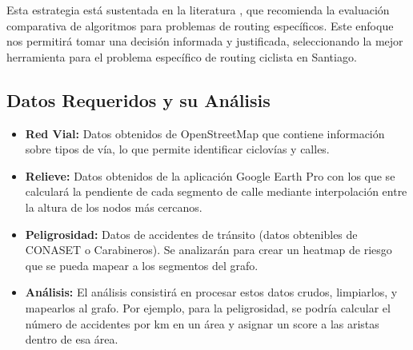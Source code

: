 \documentclass[12pt, a4paper, spanish]{article}
\begin{document}
Esta estrategia está sustentada en la literatura \cite{cormen2009}, que recomienda la evaluación comparativa de algoritmos para problemas de routing específicos. Este enfoque nos permitirá tomar una decisión informada y justificada, seleccionando la mejor herramienta para el problema específico de routing ciclista en Santiago.

\subsection{Datos Requeridos y su Análisis}

\begin{itemize}
    \item \textbf{Red Vial:} Datos obtenidos de OpenStreetMap que contiene información sobre tipos de vía, lo que permite identificar ciclovías y calles.
    \item \textbf{Relieve:} Datos obtenidos de la aplicación Google Earth Pro con los que se calculará la pendiente de cada segmento de calle mediante interpolación entre la altura de los nodos más cercanos.
    \item \textbf{Peligrosidad:} Datos de accidentes de tránsito (datos obtenibles de CONASET o Carabineros). Se analizarán para crear un heatmap de riesgo que se pueda mapear a los segmentos del grafo.
    \item \textbf{Análisis:} El análisis consistirá en procesar estos datos crudos, limpiarlos, y mapearlos al grafo. Por ejemplo, para la peligrosidad, se podría calcular el número de accidentes por km en un área y asignar un score a las aristas dentro de esa área.
\end{itemize}
\end{document}
